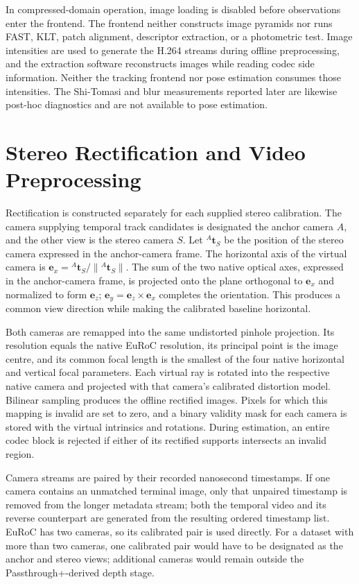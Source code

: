 In compressed-domain operation, image loading is disabled before observations
enter the frontend. The frontend neither constructs image pyramids nor
runs FAST, KLT, patch alignment, descriptor extraction, or a photometric test.
Image intensities are used to generate the H.264 streams during offline
preprocessing, and the extraction software reconstructs images while reading
codec side information. Neither the tracking frontend nor pose estimation consumes
those intensities. The Shi-Tomasi and blur measurements reported later
are likewise post-hoc diagnostics and are not available to pose estimation.

\section{Stereo Rectification and Video Preprocessing}

Rectification is constructed separately for each supplied stereo calibration.
The camera supplying temporal track candidates is designated the anchor camera
$A$, and the other view is the stereo camera $S$. Let
${}^{A}\mathbf{t}_{S}$ be the position of the stereo camera expressed in the
anchor-camera frame.
The horizontal axis of the virtual camera is
$\mathbf{e}_x={}^{A}\mathbf{t}_{S}/\lVert{}^{A}\mathbf{t}_{S}\rVert$.
The sum of the two native optical axes, expressed in the anchor-camera frame,
is projected onto
the plane orthogonal to $\mathbf{e}_x$ and normalized to form
$\mathbf{e}_z$; $\mathbf{e}_y=\mathbf{e}_z\times\mathbf{e}_x$ completes the
orientation. This produces a common view direction while making the calibrated
baseline horizontal.

Both cameras are remapped into the same undistorted pinhole projection. Its
resolution equals the native EuRoC resolution, its principal point is the image
centre, and its common focal length is the smallest of the four native horizontal
and vertical focal parameters. Each virtual ray is rotated into the respective
native camera and projected with that camera's calibrated distortion model.
Bilinear sampling produces the offline rectified images. Pixels for which this
mapping is invalid are set to zero, and a binary validity mask for each camera is
stored with the virtual intrinsics and rotations. During estimation, an entire
codec block is rejected if either of its rectified supports intersects an invalid
region.

Camera streams are paired by their recorded nanosecond timestamps. If one camera
contains an unmatched terminal image, only that unpaired timestamp is removed
from the longer metadata stream; both the temporal video and its reverse
counterpart are generated from the resulting ordered timestamp list. EuRoC has
two cameras, so its calibrated pair is used directly. For a dataset with more
than two cameras, one calibrated pair would have to be designated as the anchor
and stereo views; additional cameras would remain outside the
Passthrough+-derived depth stage.

